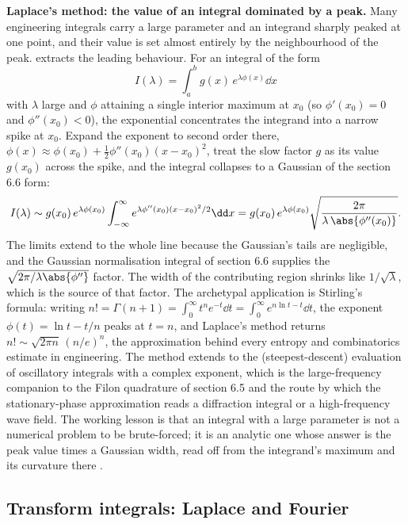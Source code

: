 \begin{mastery}
\textbf{Laplace's method: the value of an integral dominated by a peak.}
Many engineering integrals carry a large parameter and an integrand
sharply peaked at one point, and their value is set almost entirely by
the neighbourhood of the peak.  extracts the
leading behaviour. For an integral of the form
\[
I(\lambda) = \int_{a}^{b} g(x)\,e^{\lambda\phi(x)}\dd x
\]
with $\lambda$ large and $\phi$ attaining a single interior maximum at
$x_{0}$ (so $\phi'(x_{0}) = 0$ and $\phi''(x_{0}) < 0$), the exponential
concentrates the integrand into a narrow spike at $x_{0}$. Expand the
exponent to second order there, $\phi(x) \approx \phi(x_{0}) +
\tfrac{1}{2}\phi''(x_{0})(x - x_{0})^{2}$, treat the slow factor $g$ as
its value $g(x_{0})$ across the spike, and the integral collapses to a
Gaussian of the section 6.6 form:
\[
I(\lambda) \sim g(x_{0})\,e^{\lambda\phi(x_{0})}\int_{-\infty}^{\infty}
e^{\lambda\phi''(x_{0})(x - x_{0})^{2}/2}\dd x =
g(x_{0})\,e^{\lambda\phi(x_{0})}\sqrt{\frac{2\pi}{\lambda\,
\abs{\phi''(x_{0})}}}.
\]
The limits extend to the whole line because the Gaussian's tails are
negligible, and the Gaussian normalisation integral of section 6.6
supplies the $\sqrt{2\pi/\lambda\abs{\phi''}}$ factor. The width of the
contributing region shrinks like $1/\sqrt{\lambda}$, which is the source
of that factor. The archetypal application is Stirling's formula: writing
$n! = \Gamma(n+1) = \int_{0}^{\infty} t^{n}e^{-t}\dd t =
\int_{0}^{\infty} e^{n\ln t - t}\dd t$, the exponent $\phi(t) = \ln t -
t/n$ peaks at $t = n$, and Laplace's method returns $n! \sim
\sqrt{2\pi n}\,(n/e)^{n}$, the approximation behind every entropy and
combinatorics estimate in engineering. The method extends to the
 (steepest-descent) evaluation of oscillatory
integrals with a complex exponent, which is the large-frequency companion
to the Filon quadrature of section 6.5 and the route by which the
stationary-phase approximation reads a diffraction integral or a
high-frequency wave field. The working lesson is that an integral with a
large parameter is not a numerical problem to be brute-forced; it is an
analytic one whose answer is the peak value times a Gaussian width, read
off from the integrand's maximum and its curvature there
\cite{text:v2ch06-apostol-calculus}.
\end{mastery}

\subsection{Transform integrals: Laplace and Fourier}

